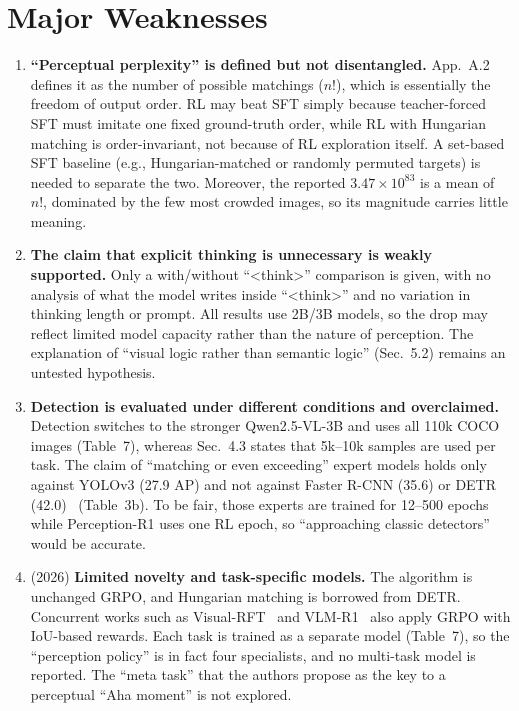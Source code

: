 \documentclass[10pt,twocolumn,letterpaper]{article}
\begin{document}
\section{Major Weaknesses}
\begin{enumerate}
    \item \textbf{``Perceptual perplexity'' is defined but not disentangled.} App.~A.2 defines it as the number of possible matchings ($n!$), which is essentially the freedom of output order. RL may beat SFT simply because teacher-forced SFT must imitate one fixed ground-truth order, while RL with Hungarian matching is order-invariant, not because of RL exploration itself. A set-based SFT baseline (e.g., Hungarian-matched or randomly permuted targets) is needed to separate the two. Moreover, the reported $3.47\times10^{83}$ is a mean of $n!$, dominated by the few most crowded images, so its magnitude carries little meaning.

    \item \textbf{The claim that explicit thinking is unnecessary is weakly supported.} Only a with/without ``<think>'' comparison is given, with no analysis of what the model writes inside ``<think>'' and no variation in thinking length or prompt. All results use 2B/3B models, so the drop may reflect limited model capacity rather than the nature of perception. The explanation of ``visual logic rather than semantic logic'' (Sec.~5.2) remains an untested hypothesis.

    \item \textbf{Detection is evaluated under different conditions and overclaimed.} Detection switches to the stronger Qwen2.5-VL-3B and uses all 110k COCO images (Table~7), whereas Sec.~4.3 states that 5k--10k samples are used per task. The claim of ``matching or even exceeding'' expert models holds only against YOLOv3 (27.9 AP) and not against Faster R-CNN (35.6) or DETR (42.0)~\cite{carion2020detr} (Table~3b). To be fair, those experts are trained for 12--500 epochs while Perception-R1 uses one RL epoch, so ``approaching classic detectors'' would be accurate.
    
    \item (2026) \textbf{Limited novelty and task-specific models.} The algorithm is unchanged GRPO, and Hungarian matching is borrowed from DETR. Concurrent works such as Visual-RFT~\cite{liu2025visualrft} and VLM-R1~\cite{shen2025vlmr1} also apply GRPO with IoU-based rewards. Each task is trained as a separate model (Table~7), so the ``perception policy'' is in fact four specialists, and no multi-task model is reported. The ``meta task'' that the authors propose as the key to a perceptual ``Aha moment'' is not explored.
    

\end{enumerate}
\end{document}
